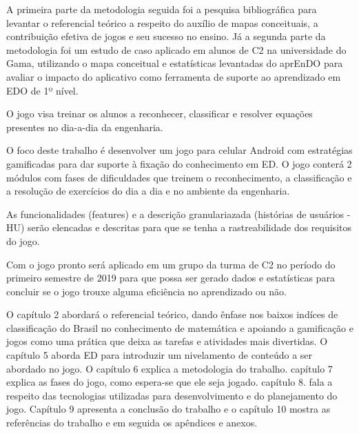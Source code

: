 A primeira parte da metodologia seguida foi a pesquisa bibliográfica para levantar o referencial teórico a respeito do auxílio de mapas conceituais, a contribuição efetiva de jogos e seu sucesso no ensino. Já a segunda parte da metodologia foi um estudo de caso aplicado em alunos de C2 na universidade do Gama, utilizando o mapa conceitual e estatísticas levantadas do aprEnDO para avaliar o impacto do aplicativo como ferramenta de suporte ao aprendizado em EDO de 1º nível.

O jogo visa treinar os alunos a reconhecer, classificar e resolver equações presentes no dia-a-dia da engenharia.

O foco deste trabalho é desenvolver um jogo para celular Android com estratégias gamificadas para dar suporte à fixação do conhecimento em ED.
O jogo conterá 2 módulos com fases de dificuldades que treinem o reconhecimento, a classificação e a resolução de exercícios do dia a dia e no ambiente da engenharia. 

As funcionalidades (features) e a descrição granulariazada (histórias de usuários - HU) serão elencadas e descritas para que se tenha a rastreabilidade dos requisitos do jogo. 

Com o jogo pronto será aplicado em um grupo da turma de C2 no período do primeiro semestre de 2019 para que possa ser gerado dados e estatísticas para concluir se o jogo trouxe alguma eficiência no aprendizado ou não.

O capítulo 2 abordará o referencial teórico, dando ênfase nos baixos indíces de classificação do Brasil no conhecimento de matemática e apoiando a gamificação e jogos como uma prática que deixa as tarefas e atividades mais divertidas.
O capítulo 5 aborda ED para introduzir um nivelamento de conteúdo a ser abordado no jogo. O capítulo 6 explica a metodologia do trabalho. capítulo 7 explica as fases do jogo, como espera-se que ele seja jogado. capítulo 8. fala a respeito das tecnologias utilizadas para desenvolvimento e do planejamento do jogo. Capítulo 9 apresenta a conclusão do trabalho e o capítulo 10 mostra as referências do trabalho e em seguida os apêndices e anexos.